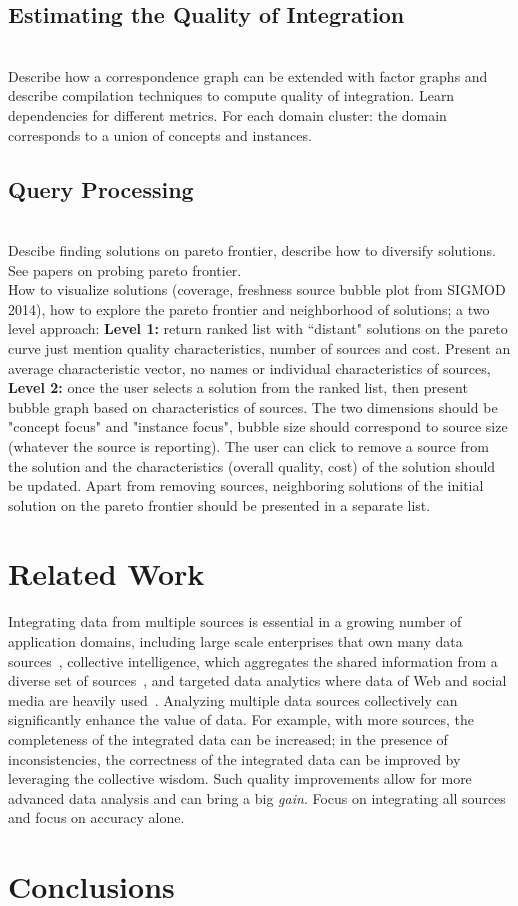 \documentclass{sig-alternate}
\begin{document}
\subsection{Estimating the Quality of Integration}

\ \\Describe how a correspondence graph can be extended with factor graphs and describe compilation techniques to compute quality of integration. Learn dependencies for different metrics. For each domain cluster: the domain corresponds to a union of concepts and instances. 

\subsection{Query Processing}

\ \\Descibe finding solutions on pareto frontier, describe how to diversify solutions. See papers on probing pareto frontier. 
\ \\How to visualize solutions (coverage, freshness source bubble plot from SIGMOD 2014), how to explore the pareto frontier and neighborhood of solutions; a two level approach: {\bf Level 1:} return ranked list with ``distant" solutions on the pareto curve just mention quality characteristics, number of sources and cost. Present an average characteristic vector, no names or individual characteristics of sources, {\bf Level 2:} once the user selects a solution from the ranked list, then present bubble graph based on characteristics of sources. The two dimensions should be "concept focus" and "instance focus", bubble size should correspond to source size (whatever the source is reporting). The user can click to remove a source from the solution and the characteristics (overall quality, cost) of the solution should be updated. Apart from removing sources, neighboring solutions of the initial solution on the pareto frontier should be presented in a separate list. 

\section{Related Work}
\label{sec:related}
Integrating data from multiple sources is essential in a growing number of application domains, including large scale enterprises that own many data sources~\cite{halevy:2006}, collective intelligence, which aggregates the shared information from a diverse set of sources~\cite{hua:2013,qi:2013}, and targeted data analytics where data of Web and social media are heavily used~\cite{jin:2013}. Analyzing multiple data sources collectively can significantly enhance the value of data. For example, with more sources, the completeness of the integrated data can be increased; in the presence of inconsistencies, the correctness of the integrated data can be improved by leveraging the collective wisdom. Such quality improvements allow for more advanced data analysis and can bring a big {\em gain}. Focus on integrating all sources and focus on accuracy alone.


\section{Conclusions}
\label{sec:conclusion}



\end{document}
